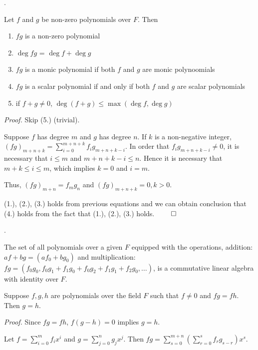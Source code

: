 \documentclass[8pt]{beamer}
\newcommand{\ti}[1]{\textit{#1}}
\begin{document}
\begin{frame}{.}
    \begin{theorem}
        Let $f$ and $g$ be non-zero polynomials over $F$.
        Then
        \begin{enumerate}
            \item $fg$ is a non-zero polynomial
            \item $\deg fg$ = $\deg f + \deg g$
            \item $fg$ is a monic polynomial if both $f$ and $g$ are monic polynoomials
            \item $fg$ is a scalar polynomial if and only if both $f$ and $g$ are scalar polynomials
            \item if $f+g \neq 0$, $\deg (f+g) \leq \max (\deg f, \deg g)$
        \end{enumerate}
    \end{theorem}
    \ti{Proof.}
    Skip (5.) (trivial).

    Suppose $f$ has degree $m$ and $g$ has degree $n$.
    If $k$ is a non-negative integer,
    $(fg)_{m+n+k} = \sum_{i=0}^{m+n+k} f_i g_{m+n+k-i}$.
    In order that $f_i g_{m+n+k-i} \neq 0$, it is necessary that $i \leq m$ and $m + n + k-i \leq n$.
    Hence it is necessary that $m+k\leq i \leq m$, which implies $k=0$ and $i=m$.

    Thus, $(fg)_{m+n} = f_m g_n$ and $(fg)_{m+n+k} = 0, k > 0$.

    (1.), (2.), (3.) holds from previous equations and we can obtain conclusion that (4.) holds from the fact that (1.), (2.), (3.) holds.
    $\qed$
\end{frame}

\begin{frame}{.}
    \begin{corollary}
        The set of all polynomials over a given $F$ equipped with the operations, addition: $af+bg = (af_0 + bg_0 )$ and multiplication: $fg = (f_0 g_0, f_0 g_1 + f_1 g_0 + f_0 g_2 + f_1 g_1 + f_2 g_0, \dots)$, is a commutative linear algebra with identity over $F$.
    \end{corollary}

    \begin{corollary}
        Suppose $f, g, h$ are polynomials over the field $F$ such that $f \neq 0$ and $fg = fh$.
        Then $g = h$.
    \end{corollary}
    \ti{Proof.}
    Since $fg = fh$, $f(g-h) = 0$ implies $g = h$.


    Let $f = \sum_{i=0}^m f_i x^i$ and $g=\sum_{j=0}^n g_j x^j$.
    Then $fg = \sum_{s=0}^{m+n}(\sum_{r=0}^s f_r g_{s-r})x^s$.
\end{frame}
\end{document}
